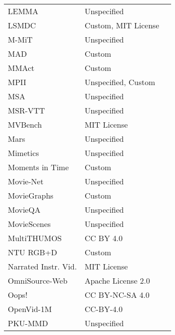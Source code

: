 \begin{longtable}{p{5cm}|p{5cm}|p{5cm}}
LEMMA & Unspecified & \autocite{jiaLEMMAMultiviewDataset2020} \\
LSMDC & Custom, MIT License & \autocite{rohrbachMovieDescription2016,sharmaDeepMultimodalFeature2020} \\
M-MiT & Unspecified & \autocite{monfortMultiMomentsTimeLearning2021} \\
MAD & Custom & \autocite{soldanMADScalableDataset2022} \\
MMAct & Custom & \autocite{kongMMActLargeScaleDataset2019} \\
MPII & Unspecified, Custom & \autocite{rohrbachRecognizingFineGrainedComposite2016,rohrbachDatasetMovieDescription2015} \\
MSA & Unspecified & \autocite{xiongGraphBasedFrameworkBridge2019} \\
MSR-VTT & Unspecified & \autocite{xuMSRVTTLargeVideo2016} \\
MVBench & MIT License & \autocite{liMVBenchComprehensiveMultimodal2024} \\
Mars & Unspecified & \autocite{zhengMARSVideoBenchmark2016} \\
Mimetics & Unspecified & \autocite{weinzaepfelMimeticsUnderstandingHuman2021} \\
Moments in Time & Custom & \autocite{monfortMomentsTimeDataset2019} \\
Movie-Net & Unspecified & \autocite{huangMovieNetHolisticDataset2020} \\
MovieGraphs & Custom & \autocite{vicolMovieGraphsUnderstandingHumanCentric2018} \\
MovieQA & Unspecified & \autocite{tapaswiMovieQAUnderstandingStories2016} \\
MovieScenes & Unspecified & \autocite{raoLocaltoGlobalApproachMultimodal2020} \\
MultiTHUMOS & CC BY 4.0 & \autocite{yeungEveryMomentCounts2017} \\
NTU RGB+D & Custom & \autocite{shahroudyNTURGBLarge2016} \\
Narrated Instr. Vid. & MIT License & \autocite{alayracUnsupervisedLearningNarrated2016} \\
OmniSource-Web & Apache License 2.0 & \autocite{duanOmnisourcedWeblysupervisedLearning2020} \\
Oops! & CC BY-NC-SA 4.0 & \autocite{epsteinOopsPredictingUnintentional2020} \\
OpenVid-1M & CC-BY-4.0 & \autocite{nanOpenVid1MLargeScaleHighQuality2024} \\
PKU-MMD & Unspecified & \autocite{liuPKUMMDLargeScale2017} \\

\end{longtable}

